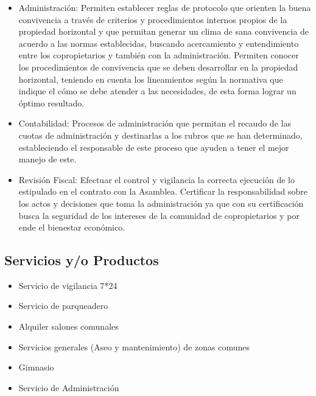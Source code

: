 \begin{itemize}
	
\item Administración: Permiten establecer reglas de protocolo que orienten la buena convivencia a través de criterios y procedimientos internos propios de la propiedad horizontal y que permitan generar un clima de sana convivencia de acuerdo a las normas establecidas, buscando acercamiento y entendimiento entre los copropietarios y también con la administración. Permiten conocer los procedimientos de convivencia que se deben desarrollar en la propiedad horizontal, teniendo en cuenta los lineamientos según la normativa que indique el cómo se debe atender a las necesidades, de esta forma lograr un óptimo resultado. 

\item Contabilidad: Procesos de administración que permitan el recaudo de las cuotas de administración y destinarlas a los rubros que se han determinado, estableciendo el responsable de este proceso que ayuden a tener el mejor manejo de este.

\item Revisión Fiscal: Efectuar el control y vigilancia la correcta ejecución de lo estipulado en el contrato con la Asamblea. Certificar la responsabilidad sobre los actos y decisiones que toma la administración ya que con su certificación busca la seguridad de los intereses de la comunidad de copropietarios y por ende el bienestar económico.
\end{itemize}

\subsection{Servicios y/o Productos}

\begin{itemize}
\item Servicio de vigilancia 7*24
\item Servicio de parqueadero
\item Alquiler salones comunales
\item Servicios generales (Aseo y mantenimiento) de zonas comunes
\item Gimnasio
\item Servicio de Administración
\end{itemize}
